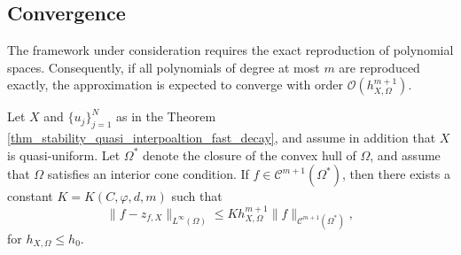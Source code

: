 \documentclass{drna}
\begin{document}
\subsection{Convergence}
The framework under consideration requires the exact reproduction of polynomial spaces. Consequently, if all polynomials of degree at most $m$ are reproduced exactly, the approximation is expected to converge with order $\mathcal{O}(h_{X,\Omega}^{m+1})$.
\begin{theorem}
Let $X$ and $\{u_j\}_{j=1}^N$ as in the Theorem \ref{thm_stability_quasi_interpoaltion_fast_decay}, and assume in addition that $X$ is quasi-uniform.
    Let $\Omega^{*}$ denote the closure of the convex hull of $\Omega$, and assume that $ \Omega $ satisfies an interior cone condition. If $f \in \mathcal{C}^{m+1}(\Omega^{*})$, then there exists a constant $K=K(C,\varphi,d,m)$ such that 
    \begin{equation*}
        \|f-z_{f,X}\|_{L^{\infty}(\Omega)} \leq K h_{X,\Omega}^{m+1}\|f\|_{\mathcal{C}^{m+1}(\Omega^*)},
    \end{equation*}
    for $h_{X,\Omega} \leq h_0$.
    \label{thm_convergence_polynomial_reproduction_exponential_decay}
\end{theorem}
\end{document}
